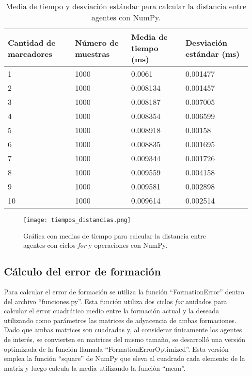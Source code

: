 \begin{table}[H]
	\centering
	\resizebox{\textwidth}{!} {
	\begin{tabular}{|l|l|l|l|}
		\hline
		\textbf{Cantidad de marcadores} & \textbf{Número de muestras} & \textbf{Media de tiempo (ms)} & \textbf{Desviación estándar (ms)} \\ \hline
		1 & 1000 & 0.0061 & 0.001477 \\ \hline
		2 & 1000 & 0.008134 & 0.001457 \\ \hline
		3 & 1000 & 0.008187 & 0.007005 \\ \hline
		4 & 1000 & 0.008354 & 0.006599 \\ \hline
		5 & 1000 & 0.008918 & 0.00158 \\ \hline
		6 & 1000 & 0.008835 & 0.001695 \\ \hline
		7 & 1000 & 0.009344 & 0.001726 \\ \hline
		8 & 1000 & 0.009559 & 0.004158 \\ \hline
		9 & 1000 & 0.009581 & 0.002898 \\ \hline
		10 & 1000 & 0.009614 & 0.002514 \\ \hline
	\end{tabular}}
	\caption{Media de tiempo y desviación estándar para calcular la distancia entre agentes con NumPy.}
	\label{cuadro:tiempos_distancias_numpy}
\end{table}

\begin{figure}[H]
	\centering
	\texttt{[image: tiempos\_distancias.png]}
	\caption{Gráfica con medias de tiempo para calcular la distancia entre agentes con ciclos \textit{for} y operaciones con NumPy.}
	\label{fig:grafica_tiempos_distancias}
\end{figure}

\subsection{Cálculo del error de formación}
Para calcular el error de formación se utiliza la función ``FormationError'' dentro del archivo ``funciones.py''. Esta función utiliza dos ciclos \textit{for} anidados para calcular el error cuadrático medio entre la formación actual y la deseada utilizando como parámetros las matrices de adyacencia de ambas formaciones. Dado que ambas matrices son cuadradas y, al considerar únicamente los agentes de interés, se convierten en matrices del mismo tamaño, se desarrolló una versión optimizada de la función llamada ``FormationErrorOptimized''. Esta versión emplea la función ``square'' de NumPy que eleva al cuadrado cada elemento de la matriz y luego calcula la media utilizando la función ``mean''.


